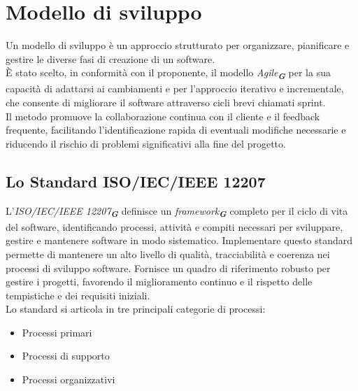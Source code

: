 
\section{Modello di sviluppo}
\label{sec:modello_sviluppo}
Un modello di sviluppo è un approccio strutturato per organizzare, pianificare e gestire le diverse fasi di creazione di un software.\\
È stato scelto, in conformità con il proponente, il modello \emph{Agile}\textsubscript{\textit{\textbf{G}}} per la sua capacità di adattarsi ai cambiamenti e per l’approccio iterativo e incrementale, che consente di migliorare il software attraverso cicli brevi chiamati sprint.\\
Il metodo promuove la collaborazione continua con il cliente e il feedback frequente, facilitando l’identificazione rapida di eventuali modifiche necessarie e riducendo il rischio di problemi significativi alla fine del progetto.\\

\subsection{Lo Standard ISO/IEC/IEEE 12207}
L'\emph{ISO/IEC/IEEE 12207}\textsubscript{\textit{\textbf{G}}} definisce un \emph{framework}\textsubscript{\textit{\textbf{G}}} completo per il ciclo di vita del software, identificando processi, attività e compiti necessari per sviluppare, gestire e mantenere software in modo sistematico. Implementare questo standard permette di mantenere un alto livello di qualità, tracciabilità e coerenza nei processi di sviluppo software. Fornisce un quadro di riferimento robusto per gestire i progetti, favorendo il miglioramento continuo e il rispetto delle tempistiche e dei requisiti iniziali.\\
Lo standard si articola in tre principali categorie di processi:
\begin{itemize}
    \item Processi primari
    \item Processi di supporto
    \item Processi organizzativi
\end{itemize}

